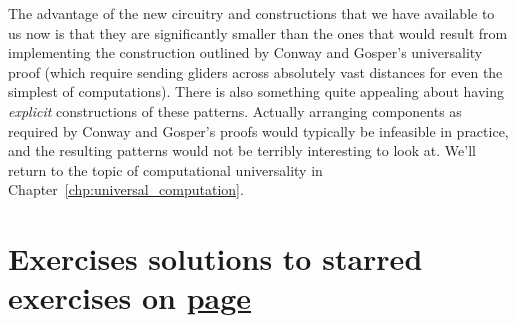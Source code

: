 The advantage of the new circuitry and constructions that we have available to us now is that they are significantly smaller than the ones that would result from implementing the construction outlined by Conway and Gosper's universality proof  (which require sending gliders across absolutely vast distances for even the simplest of computations). There is also something quite appealing about having \emph{explicit} constructions of these patterns. Actually arranging components as required by Conway and Gosper's proofs would typically be infeasible in practice, and the resulting patterns would not be terribly interesting to look at. We'll return to the topic of computational universality in Chapter~\ref{chp:universal_computation}.


\section*{Exercises \hfill \normalfont\textsf{\small solutions to starred exercises on \hyperlink{solutions_periodic_circuitry}{page \pageref{solutions_periodic_circuitry}}}}
\label{sec:periodic_exercises}
